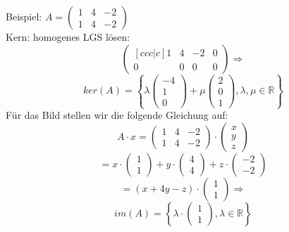 \documentclass[10pt]{scrartcl}
\begin{document}
\begin{multicols}{2}
Beispiel: $A=\begin{pmatrix}1 & 4 & -2 \\ 1 & 4 & -2\end{pmatrix}$\\
Kern: homogenes LGS lösen:
\begin{equation}
\begin{pmatrix}[ccc|c]
1 & 4 & -2 & 0\\
0 & 0 & 0 & 0
\end{pmatrix} \Rightarrow \end{equation}
\[ker(A) = \left\lbrace  \lambda \left( \begin{matrix}
-4 \\ 1 \\ 0
\end{matrix} \right) + \mu \left(\begin{matrix}
2 \\ 0 \\ 1
\end{matrix} \right), \lambda,\mu \in \mathbb{R}  \right\rbrace\]
Für das Bild stellen wir die folgende Gleichung auf:
\begin{equation}
A \cdot x = \begin{pmatrix}
1 & 4 & -2 \\
1 & 4 & -2
\end{pmatrix} \cdot \begin{pmatrix}
x \\ y \\ z
\end{pmatrix} 
\end{equation}
\[= x \cdot \begin{pmatrix}
1 \\ 1
\end{pmatrix} + y \cdot \begin{pmatrix}
4 \\ 4 
\end{pmatrix} + z \cdot \begin{pmatrix}
-2 \\ -2
\end{pmatrix}\] \[= (x+4y-z) \cdot \begin{pmatrix}
1 \\ 1
\end{pmatrix} \Rightarrow\]
\[im(A) = \left\lbrace \lambda \cdot \begin{pmatrix}
1 \\ 1
\end{pmatrix}, \lambda \in \mathbb{R} \right\rbrace \]

\end{multicols}
\end{document}

